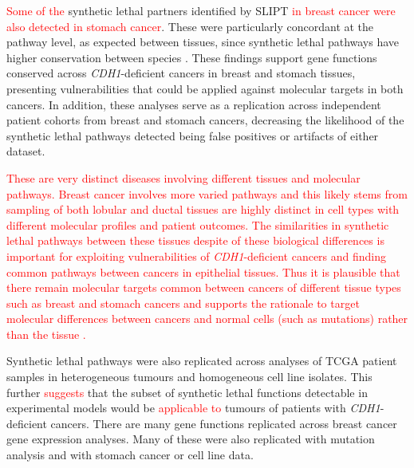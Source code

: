 \textcolor{red}{Some of the} \gls{synthetic lethal} partners identified by \gls{SLIPT} \textcolor{red}{in breast cancer were also detected in stomach cancer}. These were particularly concordant at the \gls{pathway} level, as expected between tissues, since \gls{synthetic lethal} \glspl{pathway} have higher conservation between species \citep{Dixon2008}. These findings support gene functions conserved across \textit{CDH1}-deficient cancers in breast and stomach tissues, presenting vulnerabilities that could be applied against molecular targets in both cancers. In addition, these analyses serve as a replication across independent patient cohorts from breast and stomach cancers, decreasing the likelihood of the \gls{synthetic lethal} \glspl{pathway} detected being false positives or artifacts of either dataset.

\textcolor{red}{
These are very distinct diseases involving different tissues and molecular pathways. Breast cancer involves more varied pathways and this likely stems from sampling of both lobular and ductal tissues are highly distinct in cell types with different molecular profiles and patient outcomes. The similarities in synthetic lethal pathways between these tissues despite of these biological differences is important for exploiting vulnerabilities of \textit{CDH1}-deficient cancers and finding common pathways between cancers in epithelial tissues. Thus it is plausible that there remain molecular targets common between cancers of different tissue types such as breast and stomach cancers and supports the rationale to target molecular differences between cancers and normal cells (such as mutations) rather than the tissue \citep{Perou2000, Parker2009, Vogelstein2013, Hanahan2000}. 
}

Synthetic lethal \glspl{pathway} were also replicated across  analyses of \gls{TCGA} patient samples in heterogeneous tumours and homogeneous cell line isolates. This further \textcolor{red}{suggests} that the subset of \gls{synthetic lethal} functions detectable in experimental models \citep{Chen2014, Telford2015} would be \textcolor{red}{applicable to} tumours of patients with \textit{CDH1}-deficient cancers.
%
There are many gene functions replicated across breast cancer \gls{gene expression} analyses. Many of these were also replicated with \gls{mutation} analysis and with stomach cancer or cell line  data. %

